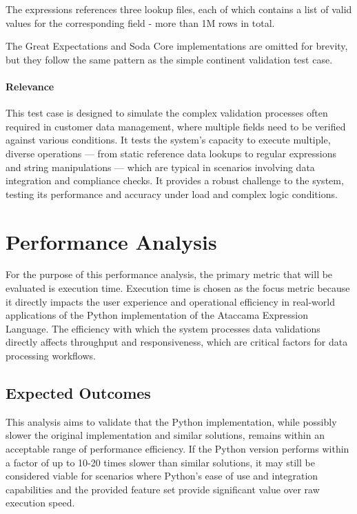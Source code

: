 The expressions references three lookup files, each of which contains a list of valid values for the corresponding field - more than 1M rows in total.

The Great Expectations and Soda Core implementations are omitted for brevity, but they follow the same pattern as the simple continent validation test case. 

\paragraph{Relevance} This test case is designed to simulate the complex validation processes often required in customer data management, where multiple fields need to be verified against various conditions. It tests the system’s capacity to execute multiple, diverse operations — from static reference data lookups to regular expressions and string manipulations — which are typical in scenarios involving data integration and compliance checks. It provides a robust challenge to the system, testing its performance and accuracy under load and complex logic conditions.


\section{Performance Analysis}


For the purpose of this performance analysis, the primary metric that will be evaluated is execution time. Execution time is chosen as the focus metric because it directly impacts the user experience and operational efficiency in real-world applications of the Python implementation of the Ataccama Expression Language. The efficiency with which the system processes data validations directly affects throughput and responsiveness, which are critical factors for data processing workflows.


\subsection{Expected Outcomes}

This analysis aims to validate that the Python implementation, while possibly slower the original implementation and similar solutions, remains within an acceptable range of performance efficiency. If the Python version performs within a factor of up to 10-20 times slower than similar solutions, it may still be considered viable for scenarios where Python’s ease of use and integration capabilities and the provided feature set provide significant value over raw execution speed. 

